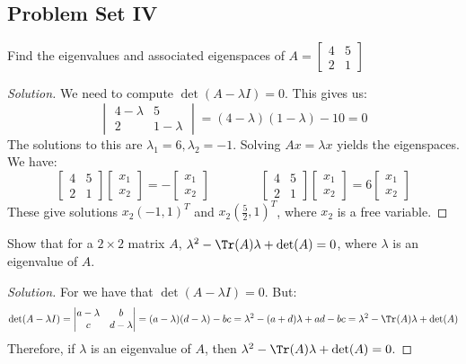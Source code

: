 \documentclass[crop=false,class=book,oneside]{standalone}
\begin{document}
\subsection{Problem Set IV}
\begin{problem}
Find the eigenvalues and associated eigenspaces of $A = \begin{bmatrix}4 & 5 \\ 2 & 1 \end{bmatrix}$
\end{problem}
\begin{proof}[Solution]
We need to compute $\det(A-\lambda I)=0$. This gives us:
\begin{equation*}
    \begin{vmatrix} 4-\lambda & 5 \\ 2 & 1-\lambda \end{vmatrix} = (4-\lambda)(1-\lambda)-10 = 0
\end{equation*}
The solutions to this are $\lambda_1 = 6, \lambda_2 = -1$. Solving $Ax = \lambda x$ yields the eigenspaces. We have:
\begin{equation*}
    \begin{bmatrix} 4 & 5 \\ 2 & 1 \end{bmatrix} \begin{bmatrix} x_1 \\ x_2 \end{bmatrix}=-\begin{bmatrix} x_1 \\ x_2 \end{bmatrix}\quad\quad\quad\quad\begin{bmatrix} 4 & 5 \\ 2 & 1 \end{bmatrix} \begin{bmatrix} x_1 \\ x_2 \end{bmatrix}=6\begin{bmatrix} x_1 \\ x_2 \end{bmatrix}
\end{equation*}
These give solutions $x_2(-1,1)^T$ and $x_2 (\frac{5}{2},1)^T$, where $x_2$ is a free variable.
\end{proof}
\begin{problem}
Show that for a $2\times 2$ matrix $A$, $\lambda^2 - \Tr(A)\lambda + \det(A) = 0$, where $\lambda$ is an eigenvalue of $A$.
\end{problem}
\begin{proof}[Solution]
For we have that $\det(A-\lambda I) = 0$. But:
\begin{equation*}
    \det(A-\lambda I)=\begin{vmatrix} a-\lambda & b \\ c & d-\lambda \end{vmatrix}=(a-\lambda)(d-\lambda)-bc=\lambda^2-(a+d)\lambda+ad-bc=\lambda^{2}-\Tr(A)\lambda+\det(A)
\end{equation*}
Therefore, if $\lambda$ is an eigenvalue of $A$, then $\lambda^2 - \Tr(A) \lambda + \det(A) = 0$.
\end{proof}
\end{document}
